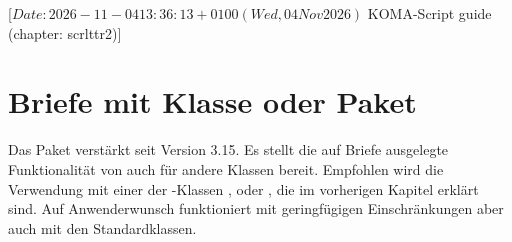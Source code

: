 %
%
%
%
%
%
%

%
                 [$Date: 2026-11-04 13:36:13 +0100 (Wed, 04 Nov 2026) $
                  KOMA-Script guide (chapter: scrlttr2)]

\chapter{Briefe mit Klasse  oder Paket }

\BeginIndexGroup
{}%
%
\iffalse%
Briefe sind in vielerlei Hinsicht etwas ganz anderes als Artikel, Berichte,
Bücher oder Ähnliches. Schon allein deshalb gibt es für Briefe ein eigenes
Kapitel.%
%
\fi%

%

Das Paket %
 verstärkt \KOMAScript{} seit Version
3.15. Es stellt die auf Briefe ausgelegte Funktionalität von 
auch für andere Klassen bereit. Empfohlen wird die Verwendung mit einer der
\KOMAScript-Klassen ,  oder ,
die im vorherigen Kapitel erklärt sind. %
\iffalse %
Mit geringfügigen Einschränkungen funktioniert \Package{scrletter}%
\else %
Auf Anwenderwunsch funktioniert  mit geringfügigen
Einschränkungen %
\fi %
aber auch mit den Standardklassen.

